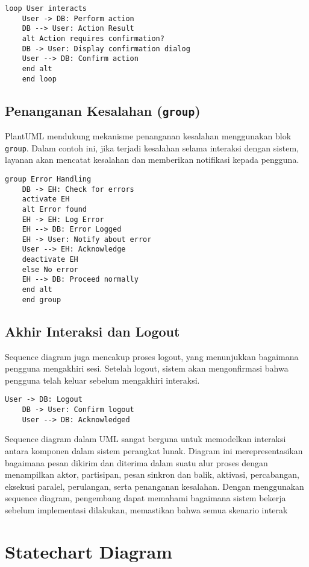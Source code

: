 \begin{lstlisting}[language=puml]
	loop User interacts
	User -> DB: Perform action
	DB --> User: Action Result
	alt Action requires confirmation?
	DB -> User: Display confirmation dialog
	User --> DB: Confirm action
	end alt
	end loop
\end{lstlisting}

\subsection{Penanganan Kesalahan (\texttt{group})}
PlantUML mendukung mekanisme penanganan kesalahan menggunakan blok \texttt{group}. Dalam contoh ini, jika terjadi kesalahan selama interaksi dengan sistem, layanan akan mencatat kesalahan dan memberikan notifikasi kepada pengguna.

\begin{lstlisting}[language=puml]
	group Error Handling
	DB -> EH: Check for errors
	activate EH
	alt Error found
	EH -> EH: Log Error
	EH --> DB: Error Logged
	EH -> User: Notify about error
	User --> EH: Acknowledge
	deactivate EH
	else No error
	EH --> DB: Proceed normally
	end alt
	end group
\end{lstlisting}

\subsection{Akhir Interaksi dan Logout}
Sequence diagram juga mencakup proses logout, yang menunjukkan bagaimana pengguna mengakhiri sesi. Setelah logout, sistem akan mengonfirmasi bahwa pengguna telah keluar sebelum mengakhiri interaksi.

\begin{lstlisting}[language=puml]
	User -> DB: Logout
	DB -> User: Confirm logout
	User --> DB: Acknowledged
\end{lstlisting}

Sequence diagram dalam UML sangat berguna untuk memodelkan interaksi antara komponen dalam sistem perangkat lunak. Diagram ini merepresentasikan bagaimana pesan dikirim dan diterima dalam suatu alur proses dengan menampilkan aktor, partisipan, pesan sinkron dan balik, aktivasi, percabangan, eksekusi paralel, perulangan, serta penanganan kesalahan. Dengan menggunakan sequence diagram, pengembang dapat memahami bagaimana sistem bekerja sebelum implementasi dilakukan, memastikan bahwa semua skenario interak



\section{Statechart Diagram}

